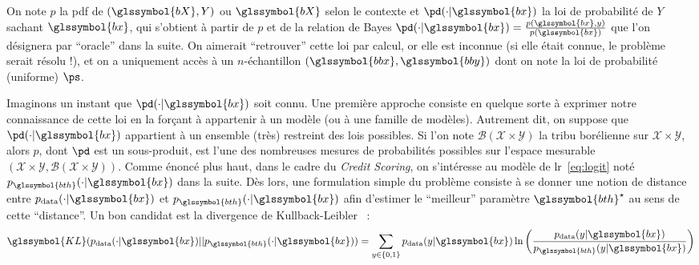 On note $p$ la \gls{pdf} de $(\glssymbol{bX},Y)$ ou $\glssymbol{bX}$ selon le contexte et $\pd(\cdot | \glssymbol{bx})$ la loi de probabilité de $Y$ sachant $\glssymbol{bx}$, qui s'obtient à partir de $p$ et de la relation de Bayes $\pd(\cdot | \glssymbol{bx}) = \frac{p(\glssymbol{bx},y)}{p(\glssymbol{bx})}$ que l'on désignera par ``oracle'' dans la suite. On aimerait ``retrouver'' cette loi par calcul, or elle est inconnue (si elle était connue, le problème serait résolu !), et on a uniquement accès à un $n$-échantillon $(\glssymbol{bbx},\glssymbol{bby})$ dont on note la loi de probabilité (uniforme) $\ps$.

Imaginons un instant que $\pd(\cdot | \glssymbol{bx})$ soit connu. Une première approche consiste en quelque sorte à exprimer notre connaissance de cette loi en la forçant à appartenir à un modèle (ou à une famille de modèles). Autrement dit, on suppose que $\pd(\cdot | \glssymbol{bx})$ appartient à un ensemble (très) restreint des lois possibles. Si l'on note $\mathcal{B}(\mathcal{X} \times \mathcal{Y})$ la tribu borélienne sur $\mathcal{X} \times \mathcal{Y}$, alors $p$, dont $\pd$ est un sous-produit, est l'une des nombreuses mesures de probabilités possibles sur l'espace mesurable $(\mathcal{X} \times \mathcal{Y},\mathcal{B}(\mathcal{X} \times \mathcal{Y}))$. Comme énoncé plus haut, dans le cadre du \textit{Credit Scoring}, on s'intéresse au modèle de \gls{lr}~\eqref{eq:logit} noté $p_{\glssymbol{bth}}(\cdot | \glssymbol{bx})$ dans la suite. Dès lors, une formulation simple du problème consiste à se donner une notion de distance entre $p_{\text{data}}(\cdot | \glssymbol{bx})$ et $p_{\glssymbol{bth}}(\cdot | \glssymbol{bx})$ afin d'estimer le ``meilleur'' paramètre $\glssymbol{bth}^\star$ au sens de cette ``distance''. Un bon candidat est la divergence de Kullback-Leibler~\cite{kullback1951information} :
\[ \glssymbol{KL}(p_{\text{data}}(\cdot | \glssymbol{bx})||p_{\glssymbol{bth}}(\cdot | \glssymbol{bx})) = \sum_{y \in \{0,1\}} p_{\text{data}}(y | \glssymbol{bx}) \ln \left( \frac{p_{\text{data}}(y | \glssymbol{bx})}{p_{\glssymbol{bth}}(y | \glssymbol{bx})} \right) \]
